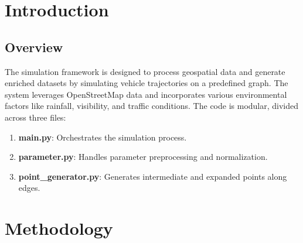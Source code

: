 \documentclass[sigplan,screen]{acmart}
\begin{document}


\maketitle

\section{Introduction}
\subsection{Overview}
The simulation framework is designed to process geospatial data and generate enriched datasets by simulating vehicle trajectories on a predefined graph.
The system leverages OpenStreetMap data and incorporates various environmental factors like rainfall, visibility, and traffic conditions. The code is modular, divided across three files:

\begin{enumerate}
    \item \textbf{main.py}: Orchestrates the simulation process.
    \item \textbf{parameter.py}: Handles parameter preprocessing and normalization.
    \item \textbf{point\_generator.py}: Generates intermediate and expanded points along edges.
\end{enumerate}

\section{Methodology}
\end{document}
